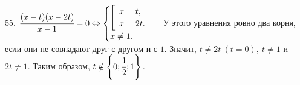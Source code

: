 55. $\cfrac{(x-t)(x-2t)}{x-1}=0\Leftrightarrow\begin{cases}\left[\begin{array}{l}x=t,\\ x=2t.\end{array}\right.\\x\neq1.\end{cases}$
У этого уравнения ровно два корня, если они не совпадают друг с другом и с $1.$ Значит, $t\neq2t\ (t=0),\ t\neq1$ и $2t\neq1.$ Таким образом, $t\notin\left\{0; \cfrac{1}{2}; 1\right\}.$\\
